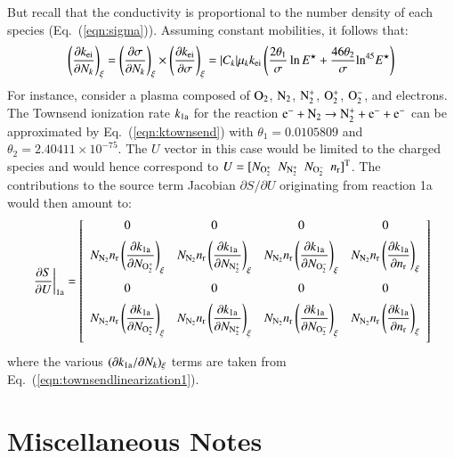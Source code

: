 \documentclass{warpdoc}
\newcommand{\alb}{\vspace{0.2cm}\\} %
\newcommand{\nr}{{{n}_{\rm r}}}
\newcommand{\mfd}{\displaystyle}
\begin{document}
%
But recall that the conductivity is proportional to the number density of each species (Eq.\ (\ref{eqn:sigma})). Assuming constant mobilities, it follows that:
%
\begin{equation}
 \left(\frac{\partial k_{\rm ei}}{\partial N_k}\right)_\xi=\left(\frac{\partial \sigma}{\partial N_k}\right)_\xi \times \left(\frac{\partial k_{\rm ei}}{\partial \sigma}\right)_\xi = |C_k| \mu_k k_{\rm ei} \left(\frac{2\theta_1}{\sigma}\ln E^\star + \frac{46 \theta_2}{\sigma} {\rm ln}^{45}E^\star \right) 
\label{eqn:townsendlinearization1}
\end{equation}
%
For instance, consider a plasma composed of $\rm O_2$, $\rm N_2$, $\rm N_2^+$, $\rm O_2^+$, $\rm O_2^-$, and electrons. The Townsend ionization rate $k_{\rm 1a}$ for the reaction $\rm e^-+N_2 \rightarrow N_2^++e^-+e^-$ can be approximated by Eq.\ (\ref{eqn:ktownsend}) with $\theta_1=0.0105809$ and $\theta_2=2.40411\times 10^{-75}$. The $U$ vector in this case would be limited to the charged species and would hence correspond to $U=[N_{\rm O_2^+}~~N_{\rm N_2^+}~~N_{\rm O_2^-}~~\nr]^{\rm T}$. The contributions to the source term Jacobian $\partial S / \partial U$ originating from reaction 1a would then amount to:
%
\begin{equation}
\left.\frac{\partial S}{\partial U}\right|_{\rm 1a}=
\left[\begin{array}{cccc}
0 & 0 & 0 &0 \alb
 \mfd N_{\rm N_2} \nr \left(\frac{\partial k_{\rm 1a}}{\partial N_{\rm O_2^+}}\right)_\xi 
  & \mfd N_{\rm N_2} \nr \left(\frac{\partial k_{\rm 1a}}{\partial N_{\rm N_2^+}}\right)_\xi
  & \mfd N_{\rm N_2} \nr \left(\frac{\partial k_{\rm 1a}}{\partial N_{\rm O_2^-}}\right)_\xi 
  & \mfd N_{\rm N_2} \nr \left(\frac{\partial k_{\rm 1a}}{\partial \nr}\right)_\xi \alb
0 & 0 & 0 &0 \alb
 \mfd N_{\rm N_2} \nr \left(\frac{\partial k_{\rm 1a}}{\partial N_{\rm O_2^+}}\right)_\xi 
  & \mfd N_{\rm N_2} \nr \left(\frac{\partial k_{\rm 1a}}{\partial N_{\rm N_2^+}}\right)_\xi
  & \mfd N_{\rm N_2} \nr \left(\frac{\partial k_{\rm 1a}}{\partial N_{\rm O_2^-}}\right)_\xi 
  & \mfd N_{\rm N_2} \nr \left(\frac{\partial k_{\rm 1a}}{\partial \nr}\right)_\xi \alb
\end{array}\right]
\label{eqn:townsendlinearization}
\end{equation}
% 
where the various $(\partial k_{\rm 1a}/\partial N_k)_\xi$ terms are taken from Eq.\ (\ref{eqn:townsendlinearization1}). 


\section{Miscellaneous Notes}
\end{document}
